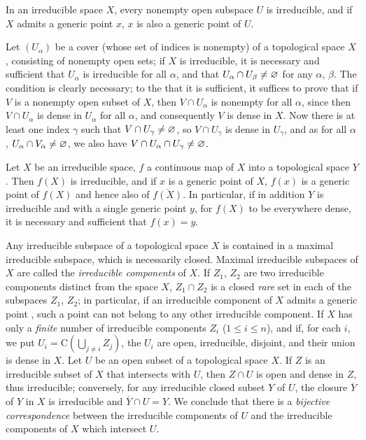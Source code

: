 \begin{env}[2.1.4]
\label{0.2.1.4}
In an irreducible space $X$, every nonempty open subspace $U$ is irreducible,
and if $X$ admits a generic point $x$, $x$ is also a generic point of $U$.

Let $(U_\alpha)$ be a cover (whose set of indices is nonempty) of a topological
space $X$, consisting of nonempty open sets; if $X$ is irreducible, it is
necessary and sufficient that $U_\alpha$ is irreducible for all $\alpha$, and
that $U_\alpha\cap U_\beta\neq\varnothing$ for any $\alpha$, $\beta$. The condition is
clearly necessary; to the that it is sufficient, it suffices to prove that if
$V$ is a nonempty open subset of $X$, then $V\cap U_\alpha$ is nonempty for all
$\alpha$, since then $V\cap U_\alpha$ is dense in $U_\alpha$ for all $\alpha$,
and consequently $V$ is dense in $X$. Now there is at least one index $\gamma$
such that $V\cap U_\gamma\neq\varnothing$, so $V\cap U_\gamma$ is dense in $U_\gamma$,
and as for all $\alpha$, $U_\alpha\cap V_\alpha\neq\varnothing$, we also have
$V\cap U_\alpha\cap U_\gamma\neq\varnothing$.
\end{env}

\begin{env}[2.1.5]
\label{0.2.1.5}
Let $X$ be an irreducible space, $f$ a continuous map of $X$ into a topological
space $Y$. Then $f(X)$ is irreducible, and if $x$ is a generic point of $X$,
$f(x)$ is a generic point of $f(X)$ and hence also of $\overline{f(X)}$. In
particular, if in addition $Y$ is irreducible and with a single generic point
$y$, for $f(X)$ to be everywhere dense, it is necessary and sufficient that
$f(x)=y$.
\end{env}

\begin{env}[2.1.6]
\label{0.2.1.6}
Any irreducible subspace of a topological space $X$ is contained in a maximal
irreducible subspace, which is necessarily closed. Maximal irreducible subspaces
of $X$ are called the {\em irreducible components} of $X$. If $Z_1$, $Z_2$ are
two irreducible components distinct from the space $X$, $Z_1\cap Z_2$ is a
closed {\em rare} set in each of the subspaces $Z_1$, $Z_2$; in particular, if
an irreducible component of $X$ admits a generic point , such a
point can not belong to any other irreducible component. If $X$ has only a
{\em finite} number of irreducible components $Z_i$
($1\leqslant i\leqslant n$), and if, for each $i$, we put
$U_i=\mathrm{C}(\bigcup_{j\neq i}Z_j)$, the $U_i$ are open, irreducible,
disjoint, and their union is dense in $X$. Let $U$ be an open subset of a
topological space $X$. If $Z$ is an irreducible subset of $X$ that intersects
with $U$, then $Z\cap U$ is open and dense in $Z$, thus irreducible; conversely,
for any irreducible closed subset $Y$ of $U$, the closure $\overline{Y}$ of $Y$
in $X$ is irreducible and $\overline{Y}\cap U=Y$. We conclude that there is a
{\em bijective correspondence} between the irreducible components of $U$ and
the irreducible components of $X$ which intersect $U$.
\end{env}

